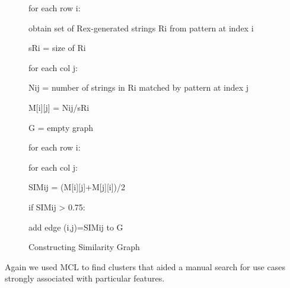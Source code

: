 \begin{figure}
\begin{description}
\setlength{\parskip}{0pt} %
\setlength{\itemindent}{0in}
\item for each row i:
\setlength{\itemindent}{0.2in}
\item obtain set of Rex-generated strings Ri from pattern at index i
\item sRi = size of Ri
\item for each col j:
\setlength{\itemindent}{0.4in}
\item Nij = number of strings in Ri matched by pattern at index j
\item M[i][j] = Nij/sRi
\setlength{\itemindent}{0in}
\item G = empty graph
\item for each row i:
\setlength{\itemindent}{0.2in}
\item for each col j:
\setlength{\itemindent}{0.4in}
\item SIMij = (M[i][j]+M[j][i])/2
\item if SIMij > 0.75:
\setlength{\itemindent}{0.6in}
\item add edge (i,j)=SIMij to G
\setlength{\itemindent}{0in}
\setlength{\parskip}{10pt} %
\end{description}
\caption{Constructing Similarity Graph \label{fig:similarityConstruction}}
\end{figure}

Again we used MCL to find clusters that aided a manual search for use cases strongly associated with particular features.











